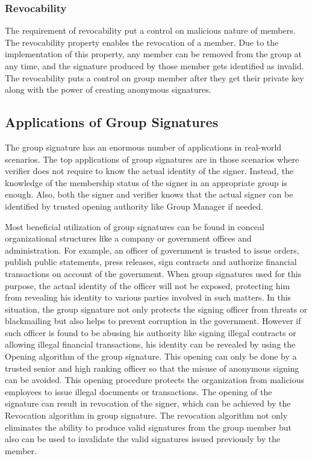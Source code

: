 \subsubsection{Revocability}
The requirement of revocability put a control on malicious nature of members. The revocability property enables the revocation of a member. Due to the implementation of this property, any member can be removed from the group at any time, and the signature produced by those member gets identified as invalid. The revocability puts a control on group member after they get their private key along with the power of creating anonymous signatures.
 
\subsection{Applications of Group Signatures}
The group signature has an enormous number of applications in real-world scenarios. The top applications of group signatures are in those scenarios where verifier does not require to know the actual identity of the signer. Instead, the knowledge of the membership status of the signer in an appropriate group is enough. Also, both the signer and verifier knows that the actual signer can be identified by trusted opening authority like Group Manager if needed.

Most beneficial utilization of group signatures can be found in conceal organizational structures like a company or government offices and administration. For example, an officer of government is trusted to issue orders, publish public statements, press releases, sign contracts and authorize financial transactions on account of the government. When group signatures used for this purpose, the actual identity of the officer will not be exposed, protecting him from revealing his identity to various parties involved in such matters. In this situation, the group signature not only protects the signing officer from threats or blackmailing but also helps to prevent corruption in the government.
However if such officer is found to be abusing his authority like signing illegal contracts or allowing illegal financial transactions, his identity can be revealed by using the Opening algorithm of the group signature. This opening can only be done by a trusted senior and high ranking officer so that the misuse of anonymous signing can be avoided. This opening procedure protects the organization from malicious employees to issue illegal documents or transactions. The opening of the signature can result in revocation of the signer, which can be achieved by the Revocation algorithm in group signature. The revocation algorithm not only eliminates the ability to produce valid signatures from the group member but also can be used to invalidate the valid signatures issued previously by the member.


